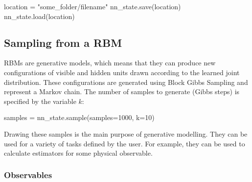 \documentclass[submission, Phys]{SciPost}
\begin{document}
\begin{python}
	location = "some_folder/filename"
	nn_state.save(location)
	nn_state.load(location)
\end{python}


\subsection{Sampling from a RBM}
\label{Sec:Sampling_a-Trained_RBM}

RBMs are generative models, which means that they can produce new configurations of visible and hidden units
drawn according to the learned joint distribution.
These configurations are generated using Block Gibbs Sampling and represent a Markov chain.
The number of samples to generate (Gibbs steps) is specified by the variable $k$:
\begin{python}
	samples = nn_state.sample(samples=1000, k=10)
\end{python}

Drawing these samples is the main purpose of generative modelling. 
They can be used for a variety of tasks defined by the user.
For example, they can be used to calculate estimators for some physical observable.

\subsubsection{Observables}
\label{Sec:Observables}
\end{document}
